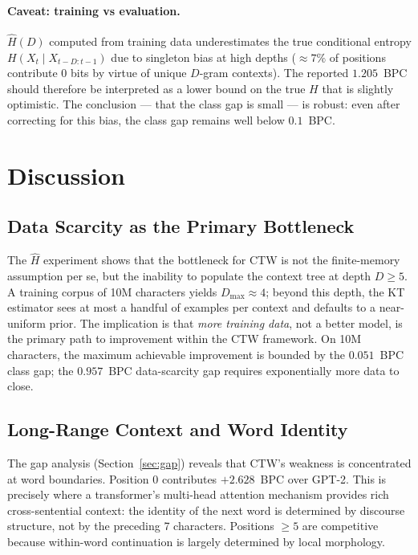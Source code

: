 \documentclass[11pt,a4paper]{article}
\newcommand{\bpcmin}{\widehat{H}}
\begin{document}
\paragraph{Caveat: training vs evaluation.}
$\bpcmin(D)$ computed from training data underestimates the true
conditional entropy $H(X_t \mid X_{t-D:t-1})$ due to singleton
bias at high depths ($\approx 7\%$ of positions contribute 0 bits
by virtue of unique $D$-gram contexts).
The reported $1.205$~BPC should therefore be interpreted as
a lower bound on the true $H$ that is slightly optimistic.
The conclusion — that the class gap is small — is robust:
even after correcting for this bias, the class gap remains
well below $0.1$~BPC.

\section{Discussion}
\label{sec:discussion}

\subsection{Data Scarcity as the Primary Bottleneck}

The $\bpcmin$ experiment shows that the bottleneck for CTW
is not the finite-memory assumption per se, but the inability
to populate the context tree at depth $D \ge 5$.
A training corpus of 10M characters yields $D_{\max} \approx 4$;
beyond this depth, the KT estimator sees at most a handful of examples
per context and defaults to a near-uniform prior.
The implication is that \emph{more training data}, not a better model,
is the primary path to improvement within the CTW framework.
On 10M characters, the maximum achievable improvement is bounded
by the $0.051$~BPC class gap; the $0.957$~BPC data-scarcity gap
requires exponentially more data to close.

\subsection{Long-Range Context and Word Identity}

The gap analysis (Section~\ref{sec:gap}) reveals that CTW's weakness
is concentrated at word boundaries.
Position 0 contributes $+2.628$~BPC over GPT-2.
This is precisely where a transformer's multi-head attention mechanism
provides rich cross-sentential context: the identity of the next word
is determined by discourse structure, not by the preceding 7 characters.
Positions $\ge 5$ are competitive because within-word continuation
is largely determined by local morphology.
\end{document}
